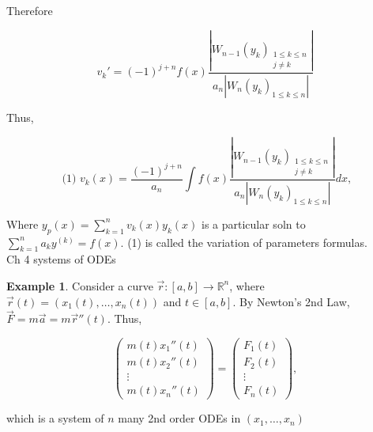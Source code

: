 \documentclass[12pt,a4paper]{article}
\theoremstyle{definition}
\newtheorem*{example}{Example}
\begin{document}
 Therefore 

 \[ v_k' = (-1)^{j+n}f(x) \frac{|W_{n-1}(y_k)_{\substack{1 \leq k \leq n
 \\
 j \neq k}}|}{a_n|W_n(y_k)_{1 \leq k \leq n}|}  \]

 Thus, 

 \[ \text{ (1) } v_k(x) = 
  \frac{(-1)^{j+n}}{a_n} \int f(x) \frac{|W_{n-1}(y_k)_{\substack{1 \leq
  k \leq n \\
  j \neq k}}|}{a_n|W_n(y_k)_{1 \leq k \leq n}|}  dx,
 \]

Where \( y_p(x) = \sum_{k=1}^{n}v_k(x)y_k(x) \) is a particular soln to
\( \sum_{k=1}^{n}a_ky^{(k)} = f(x) \). (1) is called the variation of
parameters formulas. \\[5mm]

Ch 4 systems of ODEs 

\begin{example}
  Consider a curve \( \vec{r}:[a,b] \to \mathbb{R}^n \), where \(
  \vec{r}(t) = (x_1(t), \dots , x_n(t)) \) and \( t \in [a,b] \). By
  Newton's 2nd Law, \( \vec{F} = m\vec{a} = m\vec{r}''(t)\). Thus, 

  \[ 
  \begin{pmatrix}
    m(t)x_1''(t) \\
    m(t)x_2''(t) \\
    \vdots \\
    m(t)x_n''(t) 
  \end{pmatrix}
  =
  \begin{pmatrix}
    F_1(t) \\
    F_2(t) \\
    \vdots \\
    F_n(t) 
  \end{pmatrix}
  ,
  \]
  
  which is a system of \( n \) many 2nd order ODEs in \( (x_1, \dots ,
  x_n) \)


\end{example}





\end{document}
